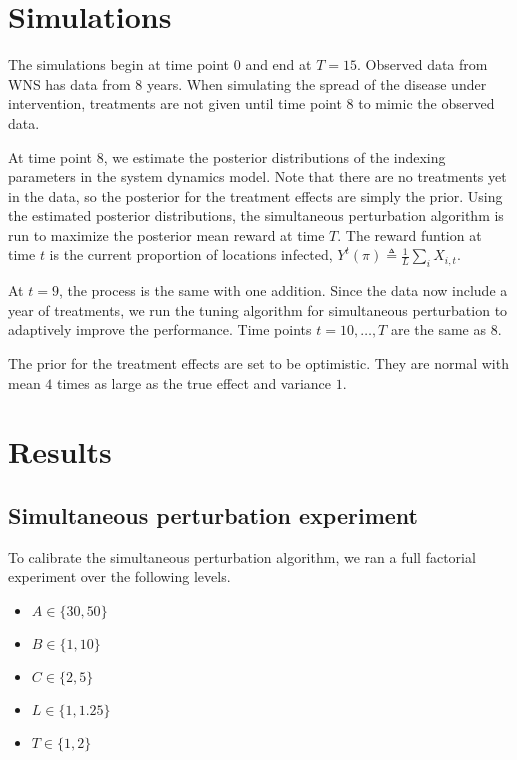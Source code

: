 \documentclass[11pt]{article}
\begin{document}
\section{Simulations}
\label{sec-4}

The simulations begin at time point $0$ and end at $T=15$.  Observed
data from WNS has data from $8$ years.  When simulating the spread
of the disease under intervention, treatments are not given until
time point $8$ to mimic the observed data.

At time point $8$, we estimate the posterior distributions of the
indexing parameters in the system dynamics model.  Note that there
are no treatments yet in the data, so the posterior for the
treatment effects are simply the prior.  Using the estimated
posterior distributions, the simultaneous perturbation algorithm is
run to maximize the posterior mean reward at time $T$.  The reward
funtion at time $t$ is the current proportion of locations infected,
$Y^t(\pi) \triangleq \frac{1}{L}\sum_i X_{i,t}$.

At $t = 9$, the process is the same with one addition.  Since the
data now include a year of treatments, we run the tuning algorithm
for simultaneous perturbation to adaptively improve the performance.
Time points $t=10,\ldots,T$ are the same as $8$.

The prior for the treatment effects are set to be optimistic.  They
are normal with mean $4$ times as large as the true effect and
variance $1$.


\section{Results}
\label{sec-5}

\subsection{Simultaneous perturbation experiment}
\label{sec-5-1}

To calibrate the simultaneous perturbation algorithm, we ran a full
factorial experiment over the following levels.
\begin{itemize}
  \item $A \in \lbrace 30, 50 \rbrace $
  \item $B \in \lbrace 1, 10 \rbrace $
  \item $C \in \lbrace 2, 5 \rbrace $
  \item $L \in \lbrace 1, 1.25 \rbrace $
  \item $T \in \lbrace 1, 2 \rbrace $
\end{itemize}
\end{document}

